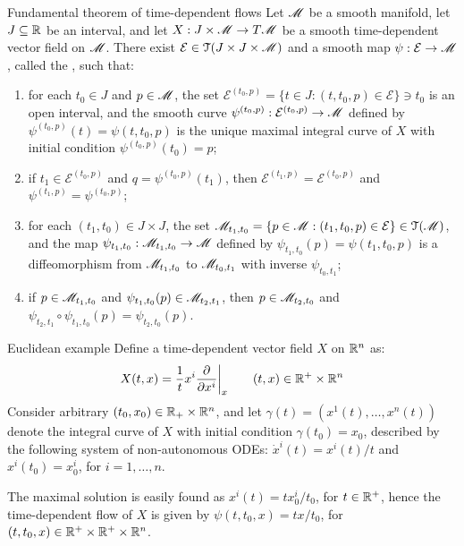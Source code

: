 \begin{theorem}{Fundamental theorem of time-dependent flows}{}
  Let $ \mathscr{M} $ be a smooth manifold, let $ J \subseteq \mathbb{R} $ be an interval, and let $ X : J \times \mathscr{M} \rightarrow T\mathscr{M} $ be a smooth time-dependent vector field on $ \mathscr{M} $. There exist $ \mathcal{E} \in \EuScript{T}(J \times J \times \mathscr{M}) $ and a smooth map $ \psi : \mathcal{E} \rightarrow \mathscr{M} $, called the , such that:
  \begin{enumerate}
    \item \label{item:fttdf-1} for each $ t_0 \in J $ and $ p \in \mathscr{M} $, the set $ \mathcal{E}^{(t_0,p)} = \{t \in J : (t,t_0,p) \in \mathcal{E}\} \ni t_0 $ is an open interval, and the smooth curve $ \psi^{(t_0,p)} : \mathcal{E}^{(t_0,p)} \rightarrow \mathscr{M} $ defined by $ \psi^{(t_0,p)}(t) = \psi(t,t_0,p) $ is the unique maximal integral curve of $ X $ with initial condition $ \psi^{(t_0,p)}(t_0) = p $;
    \item \label{item:fttdf-2} if $ t_1 \in \mathcal{E}^{(t_0,p)} $ and $ q = \psi^{(t_0,p)}(t_1) $, then $ \mathcal{E}^{(t_1,p)} = \mathcal{E}^{(t_0,p)} $ and $ \psi^{(t_1,p)} = \psi^{(t_0,p)} $;
    \item \label{item:fttdf-3} for each $ (t_1,t_0) \in J \times J $, the set $ \mathscr{M}_{t_1,t_0} = \{p \in \mathscr{M} : (t_1,t_0,p) \in \mathcal{E}\} \in \EuScript{T}(\mathscr{M}) $, and the map $ \psi_{t_1,t_0} : \mathscr{M}_{t_1,t_0} \rightarrow \mathscr{M} $ defined by $ \psi_{t_1,t_0}(p) = \psi(t_1,t_0,p) $ is a diffeomorphism from $ \mathscr{M}_{t_1,t_0} $ to $ \mathscr{M}_{t_0,t_1} $ with inverse $ \psi_{t_0,t_1} $;
    \item \label{item:fttdf-4} if $ p \in \mathscr{M}_{t_1,t_0} $ and $ \psi_{t_1,t_0}(p) \in \mathscr{M}_{t_2,t_1} $, then $ p \in \mathscr{M}_{t_2,t_0} $ and $ \psi_{t_2,t_1} \circ \psi_{t_1,t_0}(p) = \psi_{t_2,t_0}(p) $.
  \end{enumerate}
\end{theorem}

\begin{example}{Euclidean example}{}
  Define a time-dependent vector field $ X $ on $ \mathbb{R}^n $ as:
  \begin{equation*}
    X(t,x) = \frac{1}{t} x^i \frac{\partial}{\partial x^i} \bigg\vert_x
    \qquad
    (t,x) \in \mathbb{R}^+ \times \mathbb{R}^n
  \end{equation*}
  Consider arbitrary $ (t_0,x_0) \in \mathbb{R}_+ \times \mathbb{R}^n $, and let $ \gamma(t) = (x^1(t) , \dots , x^n(t)) $ denote the integral curve of $ X $ with initial condition $ \gamma(t_0) = x_0 $, described by the following system of non-autonomous ODEs: $ \dot{x}^i(t) = x^i(t) / t $ and $ x^i(t_0) = x^i_0 $, for $ i = 1 , \dots , n $.

  The maximal solution is easily found as $ x^i(t) = t x^i_0 / t_0 $, for $ t \in \mathbb{R}^+ $, hence the time-dependent flow of $ X $ is given by $ \psi(t,t_0,x) = t x / t_0 $, for $ (t,t_0,x) \in \mathbb{R}^+ \times \mathbb{R}^+ \times \mathbb{R}^n $.
\end{example}

